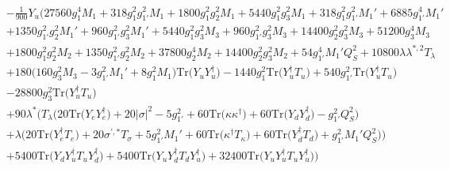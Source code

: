 {\begin{align}
 &-\frac{1}{900} Y_u \Big(27560 g_{1}^{4} M_1 +318 g_{1}^{2} g_{1'}^{2} M_1 +1800 g_{1}^{2} g_{2}^{2} M_1 +5440 g_{1}^{2} g_{3}^{2} M_1 +318 g_{1}^{2} g_{1'}^{2} M_1' +6885 g_{1'}^{4} M_1' \nonumber \\ 
 &+1350 g_{1'}^{2} g_{2}^{2} M_1' +960 g_{1'}^{2} g_{3}^{2} M_1' +5440 g_{1}^{2} g_{3}^{2} M_3 +960 g_{1'}^{2} g_{3}^{2} M_3 +14400 g_{2}^{2} g_{3}^{2} M_3 +51200 g_{3}^{4} M_3 \nonumber \\ 
 &+1800 g_{1}^{2} g_{2}^{2} M_2 +1350 g_{1'}^{2} g_{2}^{2} M_2 +37800 g_{2}^{4} M_2 +14400 g_{2}^{2} g_{3}^{2} M_2 +54 g_{1'}^{4} M_1' Q_{S}^{2} +10800 \lambda \lambda^{*,2} T_{\lambda} \nonumber \\ 
 &+180 \Big(160 g_{3}^{2} M_3  -3 g_{1'}^{2} M_1'  + 8 g_{1}^{2} M_1 \Big)\mbox{Tr}\Big({Y_u  Y_{u}^{\dagger}}\Big) -1440 g_{1}^{2} \mbox{Tr}\Big({Y_{u}^{\dagger}  T_u}\Big) +540 g_{1'}^{2} \mbox{Tr}\Big({Y_{u}^{\dagger}  T_u}\Big) \nonumber \\ 
 &-28800 g_{3}^{2} \mbox{Tr}\Big({Y_{u}^{\dagger}  T_u}\Big) \nonumber \\ 
 &+90 \lambda^* \Big(T_{\lambda} \Big(20 \mbox{Tr}\Big({Y_e  Y_{e}^{\dagger}}\Big)  + 20 |\sigma|^2  -5 g_{1'}^{2}  + 60 \mbox{Tr}\Big({\kappa  \kappa^{\dagger}}\Big)  + 60 \mbox{Tr}\Big({Y_d  Y_{d}^{\dagger}}\Big)  - g_{1'}^{2} Q_{S}^{2} \Big)\nonumber \\ 
 &+\lambda \Big(20 \mbox{Tr}\Big({Y_{e}^{\dagger}  T_e}\Big)  + 20 \sigma^{\prime,*} T_{\sigma}  + 5 g_{1'}^{2} M_1'  + 60 \mbox{Tr}\Big({\kappa^{\dagger}  T_{\kappa}}\Big)  + 60 \mbox{Tr}\Big({Y_{d}^{\dagger}  T_d}\Big)  + g_{1'}^{2} M_1' Q_{S}^{2} \Big)\Big)\nonumber \\ 
 &+5400 \mbox{Tr}\Big({Y_d  Y_{u}^{\dagger}  T_u  Y_{d}^{\dagger}}\Big) +5400 \mbox{Tr}\Big({Y_u  Y_{d}^{\dagger}  T_d  Y_{u}^{\dagger}}\Big) +32400 \mbox{Tr}\Big({Y_u  Y_{u}^{\dagger}  T_u  Y_{u}^{\dagger}}\Big) \Big)
\end{align}} 
